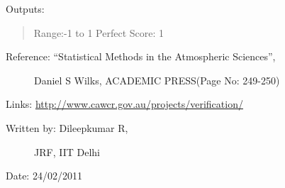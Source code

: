 \documentclass[letterpaper,10pt,english]{sphinxmanual}
\begin{document}
\begin{fulllineitems}
\begin{description}
\end{description}

Outputs:
\begin{quote}

Range:-1 to 1
Perfect Score: 1
\end{quote}
\begin{description}
\item[{Reference: ``Statistical Methods in the Atmospheric Sciences'',}] \leavevmode
Daniel S Wilks, ACADEMIC PRESS(Page No: 249-250)

\end{description}

Links: \href{http://www.cawcr.gov.au/projects/verification/}{http://www.cawcr.gov.au/projects/verification/}
\begin{description}
\item[{Written by: Dileepkumar R,}] \leavevmode
JRF, IIT Delhi

\end{description}

Date: 24/02/2011

\end{fulllineitems}

\end{document}
